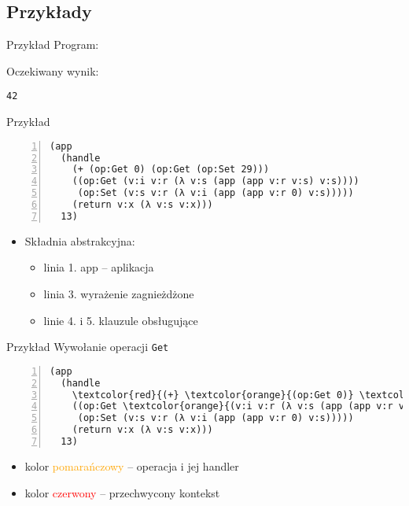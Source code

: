 \documentclass{beamer}
\begin{document}
\subsection{Przykłady}
\begin{frame}[fragile]{Przykład}
  Program:
  
  
  \pause
  Oczekiwany wynik:

  \texttt{42}
\end{frame}

\begin{frame}[fragile]{Przykład}
\begin{Verbatim}[numbers=left]
(app
  (handle
    (+ (op:Get 0) (op:Get (op:Set 29)))
    ((op:Get (v:i v:r (λ v:s (app (app v:r v:s) v:s))))
     (op:Set (v:s v:r (λ v:i (app (app v:r 0) v:s)))))
    (return v:x (λ v:s v:x)))
  13)
\end{Verbatim}
\begin{itemize}
  \item Składnia abstrakcyjna:
  \pause
  \begin{itemize}
    \item linia 1. app -- aplikacja
    \pause
    \item linia 3. wyrażenie zagnieżdżone
    \pause
    \item linie 4. i 5. klauzule obsługujące
  \end{itemize}
\end{itemize}
\end{frame}

\begin{frame}[fragile]{Przykład}
Wywołanie operacji \texttt{Get}
\begin{Verbatim}[commandchars=\\\{\},numbers=left]
(app
  (handle
    \textcolor{red}{(+} \textcolor{orange}{(op:Get 0)} \textcolor{red}{(op:Get (op:Set 29)))}
    ((op:Get \textcolor{orange}{(v:i v:r (λ v:s (app (app v:r v:s) v:s)))})
     (op:Set (v:s v:r (λ v:i (app (app v:r 0) v:s)))))
    (return v:x (λ v:s v:x)))
  13)
\end{Verbatim}
\begin{itemize}
  \pause
  \item kolor \textcolor{orange}{pomarańczowy} -- operacja i jej handler
  \pause
  \item kolor \textcolor{red}{czerwony} -- przechwycony kontekst
\end{itemize}
\end{frame}
\end{document}

